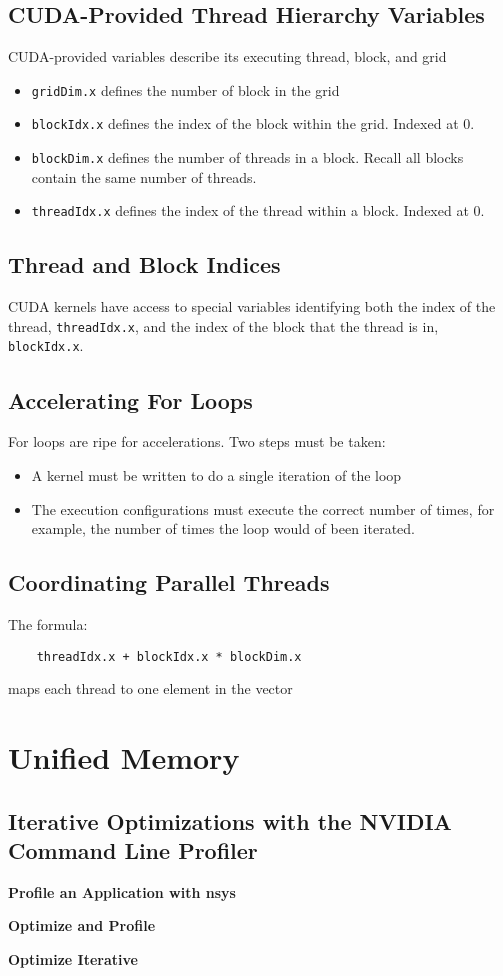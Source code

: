 \documentclass{article}
\begin{document}
\subsection{CUDA-Provided Thread Hierarchy Variables}
CUDA-provided variables describe its executing thread, block, and grid

\begin{itemize}
\item \verb_gridDim.x_ defines the number of block in the grid
\item \verb_blockIdx.x_ defines the index of the block within the grid. Indexed at 0.
\item \verb_blockDim.x_ defines the number of threads in a block. Recall all blocks contain the same number of threads.

\item \verb_threadIdx.x_ defines the index of the thread within a block. Indexed at 0.
\end{itemize}

\subsection{Thread and Block Indices}
CUDA kernels have access to special variables identifying both the index of the thread, \verb_threadIdx.x_, and the index of the block that the thread is in, \verb_blockIdx.x_.

\subsection{Accelerating For Loops}
For loops are ripe for accelerations. Two steps must be taken:
\begin{itemize}
	\item A kernel must be written to do a single iteration of the loop
	\item The execution configurations must execute the correct number of times, 		   for example, the number of times the loop would of been iterated.
\end{itemize}

\subsection{Coordinating Parallel Threads}

The formula:

\begin{verbatim}
    threadIdx.x + blockIdx.x * blockDim.x
\end{verbatim}

maps each thread to one element in the vector







\section{Unified Memory}
\subsection{Iterative Optimizations with the NVIDIA Command Line Profiler}

\textbf{Profile an Application with nsys}

\textbf{Optimize and Profile}

\textbf{Optimize Iterative}
\end{document}

